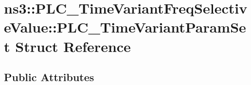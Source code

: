 \hypertarget{structns3_1_1PLC__TimeVariantFreqSelectiveValue_1_1PLC__TimeVariantParamSet}{\section{ns3\-:\-:\-P\-L\-C\-\_\-\-Time\-Variant\-Freq\-Selective\-Value\-:\-:\-P\-L\-C\-\_\-\-Time\-Variant\-Param\-Set \-Struct \-Reference}
\label{structns3_1_1PLC__TimeVariantFreqSelectiveValue_1_1PLC__TimeVariantParamSet}
}
\subsection*{\-Public \-Attributes}

